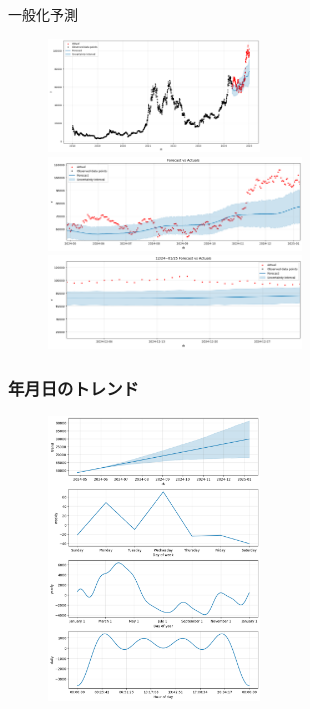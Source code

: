 \documentclass{beamer}  %
\begin{document}
\begin{frame}{一般化予測}
    \begin{figure}[h]
        \begin{center}
            \includegraphics[keepaspectratio, width=0.5\textwidth]{pic/pp_fcst1_1.png}\\
            \includegraphics[keepaspectratio, width=0.6\textwidth]{pic/pp_fcst1_2.png}\\
            \includegraphics[keepaspectratio, width=0.6\textwidth]{pic/pp_fcst1_3.png}
        \end{center}
    \end{figure}
\end{frame}

\begin{frame}
    \frametitle{年月日のトレンド}
    \begin{figure}[h]
        \includegraphics[keepaspectratio, width=0.5\textwidth]{pic/pp_fcst1.png}
    \end{figure}
\end{frame}
\end{document}
